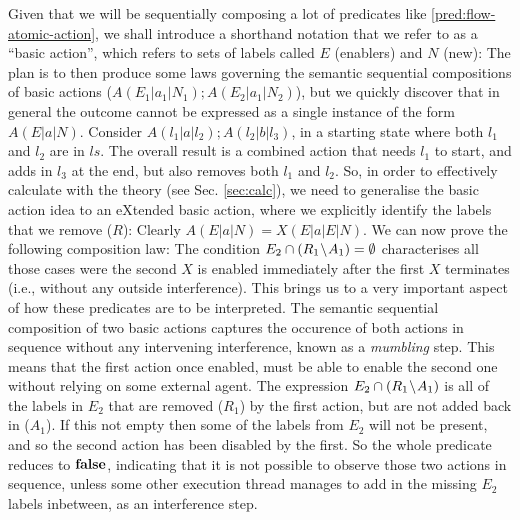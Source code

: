 Given that we will be sequentially composing a lot of predicates
like \ref{pred:flow-atomic-action},
we shall introduce a shorthand notation that we refer to as
a ``basic action'',
which refers to sets of labels called $E$ (enablers) and $N$ (new):
The plan is to then produce some laws governing
the semantic sequential compositions of basic actions
($A(E_1|a_1|N_1);A(E_2|a_1|N_2)$),
but we quickly discover that
in general the outcome cannot be expressed as a single instance
of the form $A(E|a|N)$.
Consider $A(l_1|a|l_2);A(l_2|b|l_3)$,
in a starting state where both $l_1$ and $l_2$ are in $ls$.
The overall result is a combined action that needs $l_1$
to start, and adds in $l_3$ at the end,
but also removes both $l_1$ and $l_2$.
So, in order to effectively calculate with the theory
(see Sec. \ref{sec:calc}), we need to generalise the basic action idea
to an eXtended basic action,
where we explicitly identify the labels that we remove ($R$):
Clearly $A(E|a|N) = X(E|a|E|N)$.
We can now prove the following composition law:
The condition $E_2 \cap (R_1\!\setminus\! A_1) = \emptyset$
characterises all those cases were the second $X$ is enabled
immediately after the first $X$ terminates
(i.e., without any outside interference).
This brings us to a very important aspect of how these predicates are to be
interpreted.
The semantic sequential composition of two basic actions
captures the occurence of both actions in sequence without any intervening
interference, known as a \emph{mumbling} step.
This means that the first action once enabled,
must be able to enable the second one without relying on some external agent.
The expression $E_2 \cap (R_1\!\setminus\! A_1)$ is all of the labels in $E_2$
that are removed ($R_1$) by the first action, but are not added back in ($A_1$).
If this not empty then some of the labels from $E_2$ will not be present,
and so the second action has been disabled by the first.
So the whole predicate reduces to $\mathbf{false}$,
indicating that it is not possible to observe those two actions in sequence,
unless some other execution thread manages to add in the missing $E_2$ labels
inbetween, as an interference step.
